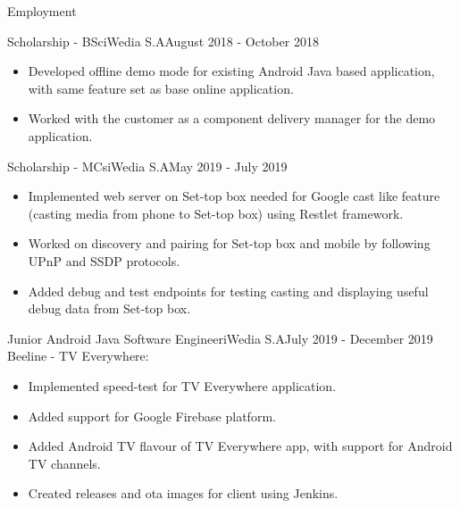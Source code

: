 \documentclass[]{mcdowellcv}
\begin{document}
	\makeheader

	\begin{cvsection}{Employment}
		\begin{cvsubsection}{Scholarship - BSc}{iWedia S.A}{August 2018 - October 2018}
			\begin{itemize}
				\item Developed offline demo mode for existing Android Java based application, with same feature set as base online application.
				\item Worked with the customer as a component delivery manager for the demo application.
			\end{itemize}
		\end{cvsubsection}

		\begin{cvsubsection}{Scholarship - MCs}{iWedia S.A}{May 2019 - July 2019}
			\begin{itemize}
				\item Implemented web server on Set-top box needed for Google cast like feature (casting media from phone to Set-top box) using Restlet framework.
				\item Worked on discovery and pairing for Set-top box and mobile by following UPnP and SSDP protocols.
				\item Added debug and test endpoints for testing casting and displaying useful debug data from Set-top box.
			\end{itemize}
		\end{cvsubsection}

		\begin{cvsubsection}{Junior Android Java Software Engineer}{iWedia S.A}{July 2019 - December 2019}\vspace{\baselineskip}
			Beeline - TV Everywhere:
			\begin{itemize}
				\item Implemented speed-test for TV Everywhere application.
				\item Added support for Google Firebase platform.
				\item Added Android TV flavour of TV Everywhere app, with support for Android TV channels.
				\item Created releases and ota images for client using Jenkins.
			\end{itemize}
		\end{cvsubsection}


\end{cvsection}
\end{document}
